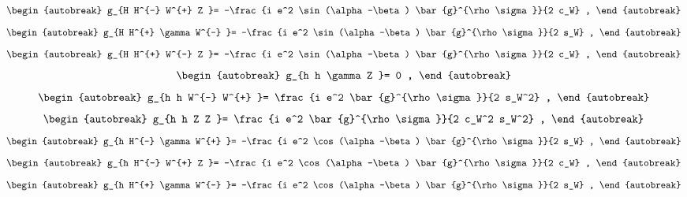 \begin{align}
\begin{autobreak}
g_{H H^{-} W^{+} Z }=
	-\frac{i e^2 \sin (\alpha -\beta ) \bar{g}^{\rho \sigma }}{2 c_W}
	,
\end{autobreak}
\end{align}
\begin{align}
\begin{autobreak}
g_{H H^{+} \gamma W^{-} }=
	-\frac{i e^2 \sin (\alpha -\beta ) \bar{g}^{\rho \sigma }}{2 s_W}
	,
\end{autobreak}
\end{align}
\begin{align}
\begin{autobreak}
g_{H H^{+} W^{-} Z }=
	-\frac{i e^2 \sin (\alpha -\beta ) \bar{g}^{\rho \sigma }}{2 c_W}
	,
\end{autobreak}
\end{align}
\begin{align}
\begin{autobreak}
g_{h h \gamma Z }=
	0
	,
\end{autobreak}
\end{align}
\begin{align}
\begin{autobreak}
g_{h h W^{-} W^{+} }=
	\frac{i e^2 \bar{g}^{\rho \sigma }}{2 s_W^2}
	,
\end{autobreak}
\end{align}
\begin{align}
\begin{autobreak}
g_{h h Z Z }=
	\frac{i e^2 \bar{g}^{\rho \sigma }}{2 c_W^2 s_W^2}
	,
\end{autobreak}
\end{align}
\begin{align}
\begin{autobreak}
g_{h H^{-} \gamma W^{+} }=
	-\frac{i e^2 \cos (\alpha -\beta ) \bar{g}^{\rho \sigma }}{2 s_W}
	,
\end{autobreak}
\end{align}
\begin{align}
\begin{autobreak}
g_{h H^{-} W^{+} Z }=
	-\frac{i e^2 \cos (\alpha -\beta ) \bar{g}^{\rho \sigma }}{2 c_W}
	,
\end{autobreak}
\end{align}
\begin{align}
\begin{autobreak}
g_{h H^{+} \gamma W^{-} }=
	-\frac{i e^2 \cos (\alpha -\beta ) \bar{g}^{\rho \sigma }}{2 s_W}
	,
\end{autobreak}
\end{align}
